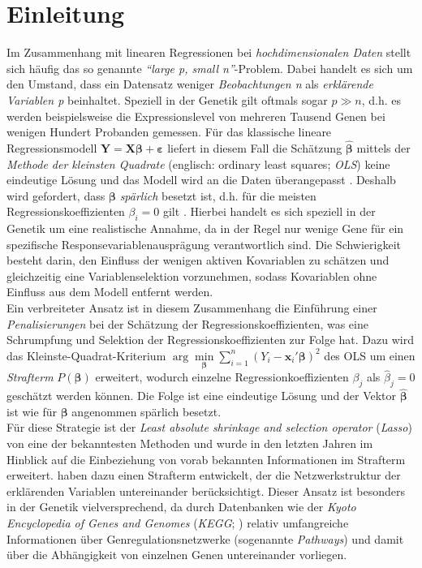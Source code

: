 \documentclass[12pt, a4paper]{report}\usepackage[]{graphicx}\usepackage[]{color}
\begin{document}
\chapter{Einleitung}
Im Zusammenhang mit linearen Regressionen bei \textit{hochdimensionalen Daten} stellt sich häufig das so genannte \textit{"`large p, small n"'}-Problem. Dabei handelt es sich um den Umstand, dass ein Datensatz weniger \textit{Beobachtungen n} als \textit{erklärende Variablen p} beinhaltet. Speziell in der Genetik gilt oftmals sogar $p \gg n$, d.h. es werden beispielsweise die Expressionslevel von mehreren Tausend Genen bei wenigen Hundert Probanden gemessen. Für das klassische lineare Regressionsmodell $\mathbf{Y}=\textbf{X}\boldsymbol\beta+\boldsymbol\varepsilon$ liefert in diesem Fall die Schätzung $\boldsymbol{\hat{\beta}}$ mittels der \textit{Methode der kleinsten Quadrate }(englisch: ordinary least squares; \textit{OLS}) keine eindeutige Lösung und das Modell wird an die Daten überangepasst \cite{hastie_efficient_2004}. Deshalb wird gefordert, dass $\boldsymbol{\beta}$ \textit{spärlich} besetzt ist, d.h. für die meisten Regressionskoeffizienten $\beta_i=0$ gilt \cite{buehlmann2011statistics}. Hierbei handelt es sich speziell in der Genetik um eine realistische Annahme, da in der Regel nur wenige Gene für ein spezifische Responsevariablenausprägung verantwortlich sind. Die Schwierigkeit besteht darin, den Einfluss der wenigen aktiven Kovariablen zu schätzen und gleichzeitig eine Variablenselektion vorzunehmen, sodass Kovariablen ohne Einfluss aus dem Modell entfernt werden.\\
Ein verbreiteter Ansatz ist in diesem Zusammenhang die Einführung einer \textit{Penalisierungen} bei der Schätzung der Regressionskoeffizienten, was eine Schrumpfung und Selektion der Regressionskoeffizienten zur Folge hat. Dazu wird das Kleinste-Quadrat-Kriterium $\arg\min\limits_{\boldsymbol{\beta}} \sum_{i=1}^{n}(Y_i - \mathbf{x}_i' \boldsymbol{\beta})^2$ des OLS \cite{fahrmeir2009regression} um einen \textit{Strafterm} $P(\boldsymbol{\beta})$ erweitert, wodurch einzelne Regressionkoeffizienten $\beta_j$ als $\hat{\beta}_j=0$ geschätzt werden können. Die Folge ist eine eindeutige Lösung und der Vektor $\boldsymbol{\hat{\beta}}$ ist wie für $\boldsymbol{\beta}$ angenommen spärlich besetzt.\\ 
Für diese Strategie ist der \textit{Least absolute shrinkage and selection operator} (\textit{Lasso}) von  eine der bekanntesten Methoden und wurde in den letzten Jahren im Hinblick auf die Einbeziehung von vorab bekannten Informationen im Strafterm erweitert.  haben dazu einen Strafterm entwickelt, der die Netzwerkstruktur der erklärenden Variablen untereinander berücksichtigt. Dieser Ansatz ist besonders in der Genetik vielversprechend, da durch Datenbanken wie der \textit{Kyoto Encyclopedia of Genes and Genomes} (\textit{KEGG}; ) relativ umfangreiche Informationen über Genregulationsnetzwerke (sogenannte \textit{Pathways}) und damit über die Abhängigkeit von einzelnen Genen untereinander vorliegen.\\
\end{document}
